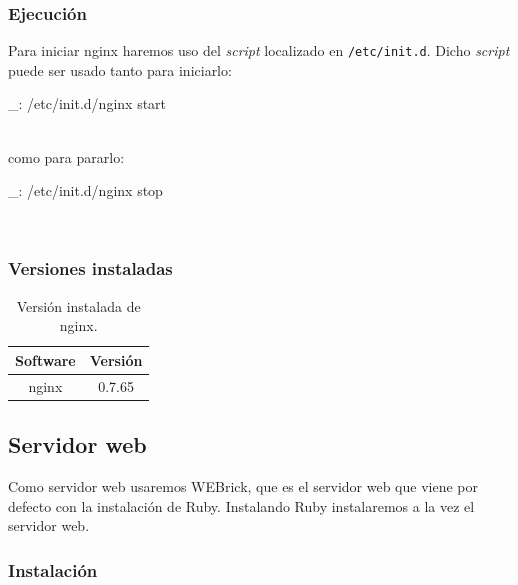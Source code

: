 \subsubsection{Ejecución}

Para iniciar nginx haremos uso del \emph{script} localizado en \texttt{/etc/init.d}. Dicho \emph{script} puede ser usado tanto para iniciarlo:

\begin{bashcode}
_: /etc/init.d/nginx start
\end{bashcode}
\\

como para pararlo:

\begin{bashcode}
_: /etc/init.d/nginx stop
\end{bashcode}
\\


\subsubsection{Versiones instaladas}

\begin{table}[!htbp]
\centering
   \begin{tabular}{|c|c|}
      \hline
      \textbf{Software} & \textbf{Versión} \\ \hline
      nginx & 0.7.65 \\ \hline
   \end{tabular}
\caption{Versión instalada de nginx.}
\label{table:web-mysql-versions}
\end{table}




\subsection{Servidor web}


Como servidor web usaremos WEBrick, que es el servidor web que viene por defecto con la instalación de Ruby. Instalando Ruby instalaremos a la vez el servidor web.


\subsubsection{Instalación}

